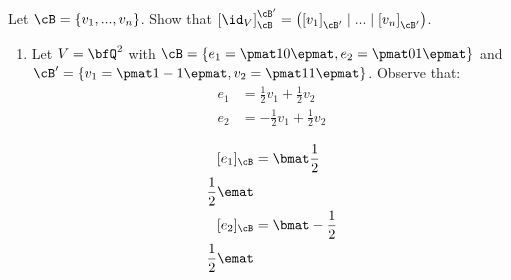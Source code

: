     \begin{exercise}
        Let $\cB = \{v_1,...,v_n\}$. Show that $\left[ \id_V \right]_\cB ^ {\cB'} = \left( \left[ v_1 \right]_{\cB'} \mid ... \mid \left[ v_n \right]_{\cB'} \right)$.
    \end{exercise}

    \begin{example}
        \phantom{a}
        \begin{enumerate}[label = (\arabic*)]
            \item Let $V = \bfQ^2$ with $\cB = \{ e_1 = \pmat 1\\0 \epmat , e_2 = \pmat 0 \\ 1 \epmat\}$ and $\cB' = \{ v_1 = \pmat 1\\-1 \epmat, v_2 = \pmat 1\\1\epmat \}$. Observe that:
                \begin{equation*}
                \begin{split}
                    e_1 &= \frac{1}{2}v_1 + \frac{1}{2}v_2 \\
                    e_2 &= -\frac{1}{2}v_1 + \frac{1}{2}v_2
                \end{split}
                \end{equation*}

                \begin{equation*}
                \begin{split}
                    [e_1]_\cB &= \bmat \frac{1}{2} \\ \frac{1}{2} \emat \\
                    [e_2]_\cB &= \bmat -\frac{1}{2} \\ \frac{1}{2} \emat \\
                \end{split}
                \end{equation*}


\end{enumerate}
\end{example}
